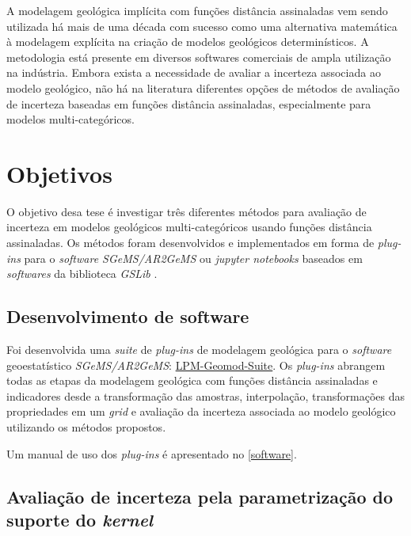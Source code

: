\begin{tcolorbox}
A modelagem geológica implícita com funções distância assinaladas vem sendo utilizada há mais de uma década com sucesso como uma alternativa matemática à modelagem explícita na criação de modelos geológicos determinísticos. A metodologia está presente em diversos softwares comerciais de ampla utilização na indústria. Embora exista a necessidade de avaliar a incerteza associada ao modelo geológico, não há na literatura diferentes opções de métodos de avaliação de incerteza baseadas em funções distância assinaladas, especialmente para modelos multi-categóricos.
\end{tcolorbox}

\section{Objetivos}

O objetivo desa tese é investigar três diferentes métodos para avaliação de incerteza em modelos geológicos multi-categóricos usando funções distância assinaladas. Os métodos foram desenvolvidos e implementados em forma de \textit{plug-ins} para o \textit{software SGeMS/AR2GeMS} \cite{remy2009applied} ou \textit{jupyter notebooks} baseados em \textit{softwares} da biblioteca \textit{GSLib} \cite{deutsch1992geostatistical}.

\subsection{Desenvolvimento de software}

Foi desenvolvida uma \textit{suite} de \textit{plug-ins} de modelagem geológica para o \textit{software} geoestatístico \textit{SGeMS/AR2GeMS}: \href{https://github.com/robertorolo/LPM-Geomod_Suite}{LPM-Geomod-Suite}. Os \textit{plug-ins} abrangem todas as etapas da modelagem geológica com funções distância assinaladas e indicadores desde a transformação das amostras, interpolação, transformações das propriedades em um \textit{grid} e avaliação da incerteza associada ao modelo geológico utilizando os métodos propostos. 

Um manual de uso dos \textit{plug-ins} é apresentado no \autoref{software}. 

\subsection{Avaliação de incerteza pela parametrização do suporte do \textit{kernel}}

